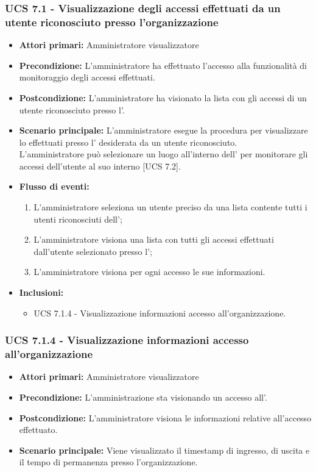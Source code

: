 \subsubsection{UCS 7.1 - Visualizzazione degli accessi effettuati da un utente riconosciuto presso l'organizzazione}
\begin{itemize}
	\item \textbf{Attori primari:} Amministratore visualizzatore
	\item \textbf{Precondizione:} L'amministratore ha effettuato l'accesso alla funzionalità di monitoraggio degli accessi effettuati.
	\item \textbf{Postcondizione:} L'amministratore ha visionato la lista con gli accessi di un utente riconosciuto presso l'.
	\item \textbf{Scenario principale:} L'amministratore esegue la procedura per visualizzare lo  effettuati presso l' desiderata da un utente riconosciuto.\\
	L'amministratore può selezionare un luogo all'interno dell' per monitorare gli accessi dell'utente al suo interno [UCS 7.2].
	\item \textbf{Flusso di eventi:}
	\begin{enumerate}
	\item L'amministratore seleziona un utente preciso da una lista contente tutti i utenti riconosciuti dell';
	\item L'amministratore visiona una lista con tutti gli accessi effettuati dall'utente selezionato presso l';
	\item L'amministratore visiona per ogni accesso le sue informazioni.
	\end{enumerate}
	\item \textbf{Inclusioni:}
    \begin{itemize}
        \item UCS 7.1.4 - Visualizzazione informazioni accesso all'organizzazione.
    \end{itemize}
\end{itemize}

\subsubsection{UCS 7.1.4 - Visualizzazione informazioni accesso all'organizzazione}
\begin{itemize}
	\item \textbf{Attori primari:} Amministratore visualizzatore
	\item \textbf{Precondizione:} L'amministrazione sta visionando un accesso all'.
	\item \textbf{Postcondizione:} L'amministratore visiona le informazioni relative all'accesso effettuato.
	\item \textbf{Scenario principale:} Viene visualizzato il timestamp di ingresso, di uscita e il tempo di permanenza presso l'organizzazione.
\end{itemize}

